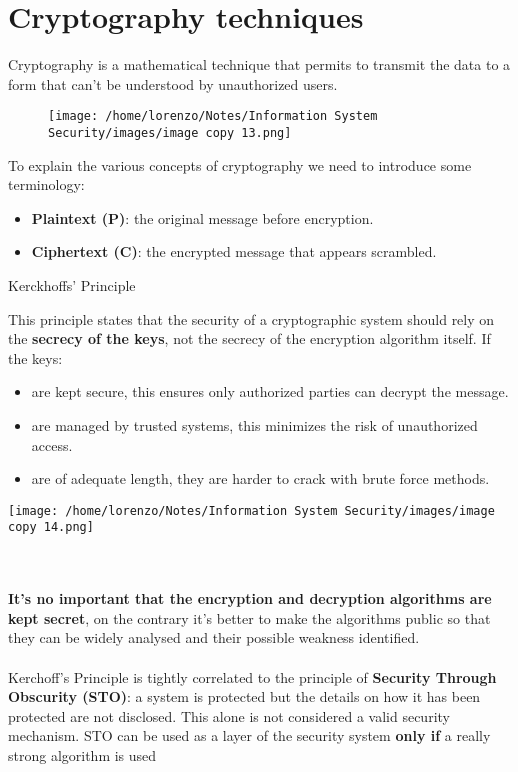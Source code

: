 \chapter{Cryptography techniques}
Cryptography is a mathematical technique that permits to transmit the data to a form that can't be understood by unauthorized users.
\begin{figure}[H]
    \centering
    \texttt{[image: /home/lorenzo/Notes/Information System Security/images/image copy 13.png]}
\end{figure}
\noindent
To explain the various concepts of cryptography we need to introduce some terminology:
\begin{itemize}
    \item \textbf{Plaintext (P)}: the original message before encryption.
    \item \textbf{Ciphertext (C)}: the encrypted message that appears scrambled.
\end{itemize}
\begin{quotebox-grey}{Kerckhoffs' Principle}
\begin{minipage}{0.7\textwidth}
	\vspace{-0.3cm}
This principle states that the security of a cryptographic system should rely on the \textbf{secrecy of the keys}, not the secrecy of the encryption algorithm itself. 
If the keys:
\begin{itemize}
\item are kept secure, this ensures only authorized parties can decrypt the message.
\item are managed by trusted systems, this minimizes the risk of unauthorized access.
\item are of adequate length, they are harder to crack with brute force methods. 
\end{itemize} 
\end{minipage} 
\hspace{0.3cm}
\begin{minipage}{0.3\textwidth}
    \centering
    \texttt{[image: /home/lorenzo/Notes/Information System Security/images/image copy 14.png]}
\end{minipage}
\noindent
\\
\\
\textbf{It's no important that the encryption and decryption algorithms are kept secret}, on the contrary it's better to make the algorithms public so that they can be widely analysed and their possible weakness identified. 
\\
\\
Kerchoff’s Principle is tightly correlated to the principle of \textbf{Security Through Obscurity
(STO)}: a system is protected but the details on how it has been protected are not disclosed.
This alone is not considered a valid security mechanism. STO can be used as a layer of the security system \textbf{only if} a really strong algorithm is used
\end{quotebox-grey}
\newpage
